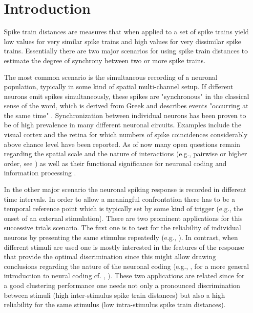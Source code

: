 \documentclass[10pt,twocolumn]{elsart5p}
\begin{document}
\section{\label{s:Intro} Introduction}

Spike train distances are measures that when applied to a set of spike trains yield low values for very similar spike trains and high values for very dissimilar spike trains. Essentially there are two major scenarios for using spike train distances to estimate the degree of synchrony between two or more spike trains.

The most common scenario is the simultaneous recording of a neuronal population, typically in some kind of spatial multi-channel setup. If different neurons emit spikes simultaneously, these spikes are "synchronous" in the classical sense of the word, which is derived from Greek and describes events "occurring at the same time" \citep{Pikovsky01}. Synchronization between individual neurons has been proven to be of high prevalence in many different neuronal circuits. Examples include the visual cortex \citep{Tiesinga08} and the retina \citep{Shlens08} for which numbers of spike coincidences considerably above chance level have been reported. As of now many open questions remain regarding the spatial scale and the nature of interactions (e.g., pairwise or higher order, see \citep{Nirenberg07}) as well as their functional significance for neuronal coding and information processing \citep{Kumar10}.

In the other major scenario the neuronal spiking response is recorded in different time intervals. In order to allow a meaningful confrontation there has to be a temporal reference point which is typically set by some kind of trigger (e.g., the onset of an external stimulation). There are two prominent applications for this successive trials scenario. The first one is to test for the reliability of individual neurons by presenting the same stimulus repeatedly (e.g., \citet{Mainen95}). In contrast, when different stimuli are used one is mostly interested in the features of the response that provide the optimal discrimination since this might allow drawing conclusions regarding the nature of the neuronal coding (e.g., \citet{Victor05}, for a more general introduction to neural coding cf. \citeauthor{QuianQuiroga02b}, \citeyear{QuianQuiroga02b}). These two applications are related since for a good clustering performance one needs not only a pronounced discrimination between stimuli (high inter-stimulus spike train distances) but also a high reliability for the same stimulus (low intra-stimulus spike train distances).
\end{document}
